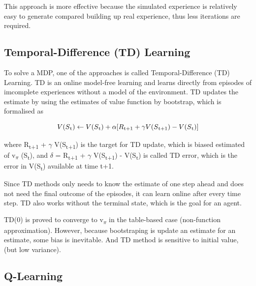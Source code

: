 \documentclass[12pt,twoside]{report}
\begin{document}
This approach is more effective because the simulated experience is relatively easy to generate compared building up real experience, thus less iterations are required.

\subsection{Temporal-Difference (TD) Learning}
\label{td_learning_section}

To solve a MDP, one of the approaches is called Temporal-Difference (TD) Learning.
TD is an online model-free learning and learns directly from episodes of imcomplete experiences without a model of the environment.
TD updates the estimate by using the estimates of value function by bootstrap, which is formalised as

\begin{equation}
\centering
V(S\textsubscript{t}) \leftarrow V(S\textsubscript{t}) + \alpha[R\textsubscript{t+1} + \gamma V(S\textsubscript{t+1}) - V(S\textsubscript{t})]
\end{equation}

where R\textsubscript{t+1} + $\gamma$ V(S\textsubscript{t+1}) is the target for TD update, which is biased estimated of v\textsubscript{$\pi$} (S\textsubscript{t}), and $\delta$ = R\textsubscript{t+1} + $\gamma$ V(S\textsubscript{t+1}) - V(S\textsubscript{t}) is called TD error, which is the error in V(S\textsubscript{t}) available at time t+1.

Since TD methods only needs to know the estimate of one step ahead and does not need the final outcome of the episodes, it can learn online after every time step. TD also works without the terminal state, which is the goal for an agent.

TD(0) is proved to converge to v\textsubscript{$\pi$} in the table-based case (non-function approximation).
However, because bootstraping is update an estimate for an estimate, some bias is inevitable. And TD method is sensitive to initial value, (but low variance).

\subsection{Q-Learning}
\label{q_learning_section}
\end{document}
